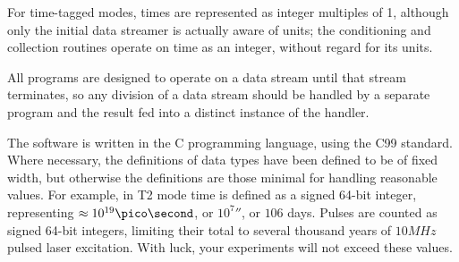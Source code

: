 \documentclass{book}
\begin{document}
For time-tagged modes, times are represented as integer multiples of 1\pico\second, although only the initial data streamer is actually aware of units; the conditioning and collection routines operate on time as an integer, without regard for its units.

All programs are designed to operate on a data stream until that stream terminates, so any division of a data stream should be handled by a separate program and the result fed into a distinct instance of the handler. 

The software is written in the C programming language, using the C99 standard. Where necessary, the definitions of data types have been defined to be of fixed width, but otherwise the definitions are those minimal for handling reasonable values. For example, in T2 mode time is defined as a signed 64-bit integer, representing $\approx 10^{19}\pico\second$, or $10^{7}\second$, or $106$ days. Pulses are counted as signed 64-bit integers, limiting their total to several thousand years of $10MHz$ pulsed laser excitation. With luck, your experiments will not exceed these values. 






\end{document}
